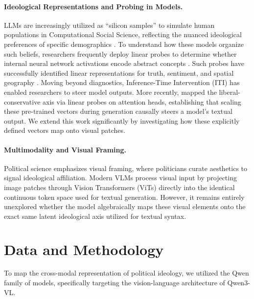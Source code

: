 \documentclass{article}
\begin{document}
\paragraph{Ideological Representations and Probing in Models.} LLMs are increasingly utilized as ``silicon samples'' to simulate human populations in Computational Social Science, reflecting the nuanced ideological preferences of specific demographics \citep{argyleOutOneMany2023, potterHiddenPersuadersLLMs2024, daiArtificialLeviathanExploring2024}. To understand how these models organize such beliefs, researchers frequently deploy linear probes to determine whether internal neural network activations encode abstract concepts \citep{alainUnderstandingIntermediateLayers2016, belinkovProbingClassifiersPromises2022}. Such probes have successfully identified linear representations for truth, sentiment, and spatial geography \citep{marksGeometryTruthEmergent2023, tiggesLinearRepresentationsSentiment2023, gurneeLanguageModelsRepresent2023}. Moving beyond diagnostics, Inference-Time Intervention (ITI) \citep{liInferenceTimeInterventionEliciting2023} has enabled researchers to steer model outputs. More recently, \citet{kimLinearRepresentationsPolitical2025} mapped the liberal-conservative axis via linear probes on attention heads, establishing that scaling these pre-trained vectors during generation causally steers a model's textual output. We extend this work significantly by investigating how these explicitly defined vectors map onto visual patches.

\paragraph{Multimodality and Visual Framing.} Political science emphasizes visual framing, where politicians curate aesthetics to signal ideological affiliation. Modern VLMs process visual input by projecting image patches through Vision Transformers (ViTs) directly into the identical continuous token space used for textual generation. However, it remains entirely unexplored whether the model algebraically maps these visual elements onto the exact same latent ideological axis utilized for textual syntax.

\section{Data and Methodology}

To map the cross-modal representation of political ideology, we utilized the Qwen family of models, specifically targeting the vision-language architecture of Qwen3-VL.
\end{document}
